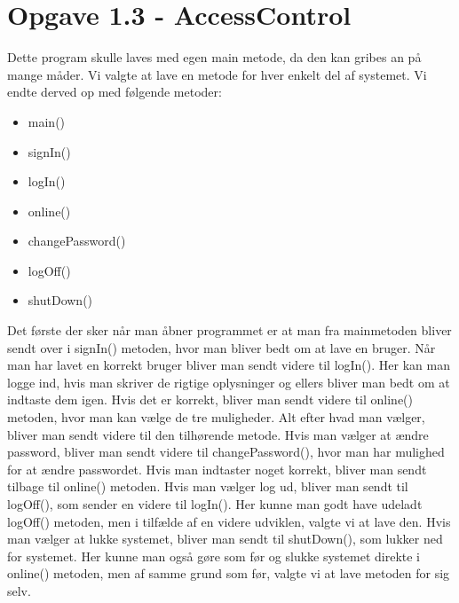 \section{Opgave 1.3 - AccessControl}

Dette program skulle laves med egen main metode, da den kan gribes an på mange måder. Vi valgte at lave en metode for hver enkelt del af systemet. Vi endte derved op med følgende metoder: 

\begin{itemize}
    \item main()
    \item signIn()
    \item logIn()
    \item online()
    \item changePassword()
    \item logOff()
    \item shutDown()
\end{itemize}

Det første der sker når man åbner programmet er at man fra mainmetoden bliver sendt over i signIn() metoden, hvor man bliver bedt om at lave en bruger. Når man har lavet en korrekt bruger bliver man sendt videre til logIn(). Her kan man logge ind, hvis man skriver de rigtige oplysninger og ellers bliver man bedt om at indtaste dem igen. Hvis det er korrekt, bliver man sendt videre til online() metoden, hvor man kan vælge de tre muligheder. Alt efter hvad man vælger, bliver man sendt videre til den tilhørende metode. Hvis man vælger at ændre password, bliver man sendt videre til changePassword(), hvor man har mulighed for at ændre passwordet. Hvis man indtaster noget korrekt, bliver man sendt tilbage til online() metoden. Hvis man vælger log ud, bliver man sendt til logOff(), som sender en videre til logIn(). Her kunne man godt have udeladt logOff() metoden, men i tilfælde af en videre udviklen, valgte vi at lave den. Hvis man vælger at lukke systemet, bliver man sendt til shutDown(), som lukker ned for systemet. Her kunne man også gøre som før og slukke systemet direkte i online() metoden, men af samme grund som før, valgte vi at lave metoden for sig selv.